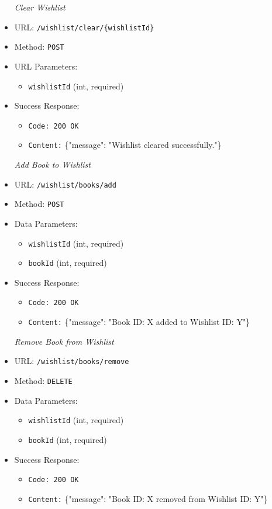 \begin{itemize}
\item[\textit{Clear Wishlist}] 
\item URL: \texttt{/wishlist/clear/\{wishlistId\}}  
\item Method: \texttt{POST}  
\item URL Parameters:
\begin{itemize}
  \item \texttt{wishlistId} (int, required)
\end{itemize}
\item Success Response:
\begin{itemize}
  \item \texttt{Code: 200 OK}  
  \item \texttt{Content:} \{"message": "Wishlist cleared successfully."\}
\end{itemize}

\item[\textit{Add Book to Wishlist}]
\item URL: \texttt{/wishlist/books/add}  
\item Method: \texttt{POST}  
\item Data Parameters:
\begin{itemize}
  \item \texttt{wishlistId} (int, required)  
  \item \texttt{bookId} (int, required)
\end{itemize}
\item Success Response:
\begin{itemize}
  \item \texttt{Code: 200 OK}  
  \item \texttt{Content:} \{"message": "Book ID: X added to Wishlist ID: Y"\}
\end{itemize}

\item[\textit{Remove Book from Wishlist}] 
\item URL: \texttt{/wishlist/books/remove}  
\item Method: \texttt{DELETE}  
\item Data Parameters:
\begin{itemize}
  \item \texttt{wishlistId} (int, required)  
  \item \texttt{bookId} (int, required)
\end{itemize}
\item Success Response:
\begin{itemize}
  \item \texttt{Code: 200 OK}  
  \item \texttt{Content:} \{"message": "Book ID: X removed from Wishlist ID: Y"\}
\end{itemize}


\end{itemize}
